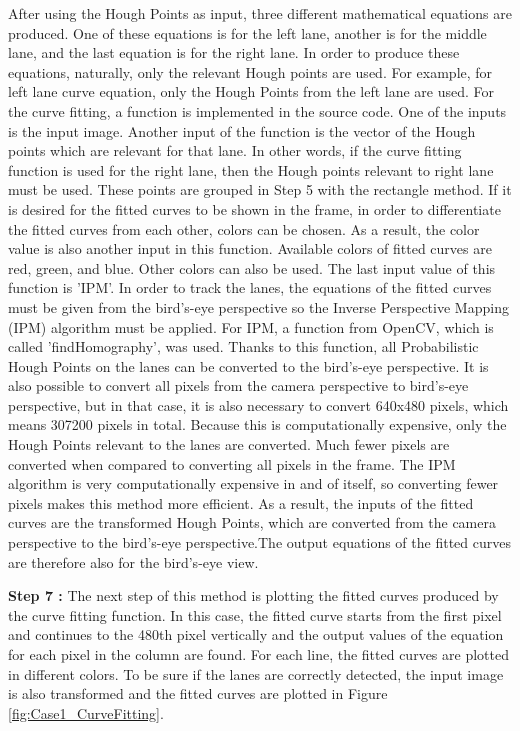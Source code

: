 After using the Hough Points as input, three different mathematical equations are produced. One of these equations is for the left lane, another is for the middle lane, and the last equation is for the right lane. In order to produce these equations, naturally, only the relevant Hough points are used. For example, for left lane curve equation, only the Hough Points from the left lane are used. For  the curve fitting, a function is implemented in the source code. One of the inputs is the input image. Another input of the function is the vector of the Hough points which are relevant for that lane. In other words, if the curve fitting function is used for the right lane, then the Hough points relevant to right lane must be used. These points are grouped in Step 5 with the rectangle method.  If  it is desired for the fitted curves to be shown in the frame, in order to differentiate the fitted curves from each other, colors can be chosen. As a result, the color value is also another input in this function. Available colors of fitted curves are red, green, and blue. Other colors can also be used. The last input value of this function is 'IPM'. In order to track the lanes, the equations of the fitted curves must be given from the bird's-eye perspective so the Inverse Perspective Mapping (IPM) algorithm must be applied. For IPM, a function from OpenCV, which is called 'findHomography', was used. Thanks to this function, all Probabilistic Hough Points on the lanes can be converted to the bird's-eye perspective. It is also possible to convert all pixels from the camera perspective to bird's-eye perspective, but in that case, it is also necessary to convert 640x480 pixels, which means 307200 pixels in total. Because this is computationally expensive, only the Hough Points relevant to the lanes are converted. Much fewer pixels are converted when compared to converting all pixels in the frame. The IPM algorithm is very computationally expensive in and of itself, so converting fewer pixels makes this method more efficient. As a result, the inputs of the fitted curves are the transformed Hough Points, which are converted from the camera perspective to the bird's-eye perspective.The output equations of the fitted curves are therefore also for the bird's-eye view.
 
\textbf{Step 7 : }The next step of this method is plotting the fitted curves produced by the curve fitting function. In this case, the fitted curve starts from the first pixel and continues to the 480th pixel vertically and the output values of the equation for each pixel in the column are found. For each line, the fitted curves are plotted in different colors. To be sure if the lanes are correctly detected, the input image is also transformed and the fitted curves are plotted in Figure \ref{fig:Case1_CurveFitting}.


